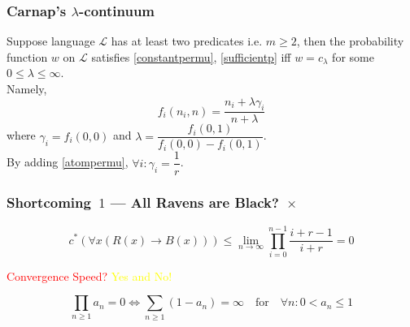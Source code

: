 \documentclass[UTF8,11pt,colorlinks,compress,openany]{beamer}%
\begin{document}
\begin{frame}\frametitle{Carnap's $\lambda$-continuum}
	\begin{theorem}
		Suppose language $\mathscr{L}$ has at least two predicates i.e. $m\geq 2$, then the probability function $w$ on $\mathscr{L}$ satisfies \ref{constantpermu}, \ref{sufficientp} iff $w=c_\lambda$ for some $0\leq\lambda\leq\infty$.\\
		Namely,
		\[f_i(n_i,n)=\dfrac{n_i+\lambda\gamma_i}{n+\lambda}\]
		where $\gamma_i=f_i(0,0)$ and $\lambda=\dfrac{f_i(0,1)}{f_i(0,0)-f_i(0,1)}$.\\
		By adding \ref{atompermu}, $\forall i: \gamma_i=\dfrac{1}{r}$.
	\end{theorem}
\end{frame}

\begin{frame}\frametitle{Shortcoming~$1$ --- All Ravens are Black?~$\times$}
	\[c^*\left(\forall x\left(R(x)\to B(x)\right)\right)\leq\lim\limits_{n\to\infty}\prod\limits_{i=0}^{n-1}\dfrac{i+r-1}{i+r}=0\]
	
	\begin{center}
		\textcolor{red}{Convergence Speed?} \textcolor{yellow}{\large Yes and No!}
	\end{center}
	
	\begin{block}{}
		\[\prod\limits_{n\geq 1} a_n=0\iff\sum\limits_{n\geq 1}(1-a_n)=\infty\quad\mbox{for}\quad\forall n: 0<a_n\leq 1\]
	\end{block}
\end{frame}
\end{document}
